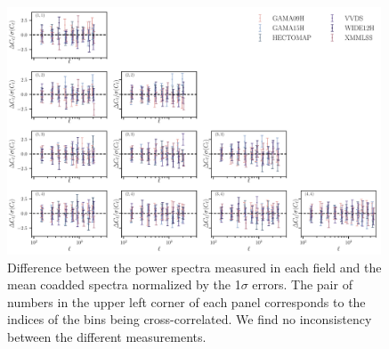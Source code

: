 \documentclass[a4paper,11pt]{article}
\begin{document}
      \begin{figure}
        \centering
        \includegraphics[width=0.99\textwidth]{figures/cls_consistency.pdf}
        \caption{Difference between the power spectra measured in each field and the mean coadded spectra normalized by the 1$\sigma$ errors. The pair of numbers in the upper left corner of each panel corresponds to the indices of the bins being cross-correlated. We find no inconsistency between the different measurements.}
        \label{fig:cls_consistency}
      \end{figure}
      
\end{document}
